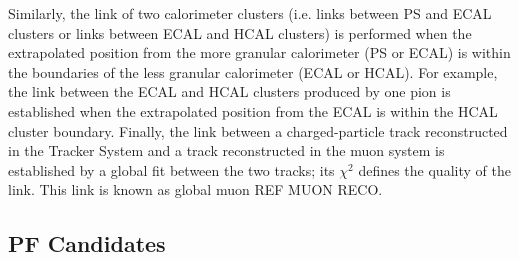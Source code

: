 \noindent Similarly, the link of two calorimeter clusters (i.e. links between PS and ECAL clusters or links 
between ECAL and HCAL clusters) is performed when the extrapolated position from the more granular calorimeter (PS or ECAL) is within 
the boundaries of the less granular calorimeter (ECAL or HCAL). For example, the link between the ECAL and HCAL clusters
produced by one pion is established when the extrapolated position from the ECAL is within the HCAL cluster boundary. Finally, the 
link between a charged-particle track reconstructed in the Tracker System and a track reconstructed in the muon system is 
established by a global fit between the two tracks; its $\chi^{2}$ defines the quality of the link. This link is known as global
muon REF MUON RECO.

\subsection{PF Candidates}
\label{sec:PFCandidates}

